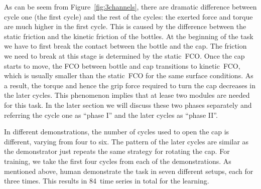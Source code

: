 As can be seem from Figure~\ref{fig:3channels}, there are dramatic
difference between cycle one (the first cycle) and the rest of the
cycles: the exerted force and torque are much higher in the first
cycle. This is caused by the difference between the static friction
and the kinetic friction of the bottles. At the beginning of the task
we have to first break the contact between the bottle and the cap. The
friction we need to break at this stage is determined by the
static~FCO. Once the cap starts to move, the FCO between bottle and
cap transitions to kinetic~FCO, which is usually smaller than the
static~FCO for the same surface conditions. As a result, the torque and
hence the grip force required to turn the cap decreases in the later
cycles. This phenomenon implies that at lease two modules are needed
for this task. In the later section we will discuss these two phases
separately and referring the cycle one as ``phase I'' and the later cycles
as ``phase II''.

In different demonstrations, the number of cycles used to open the cap is different, varying from four to six. The pattern of the later
cycles are similar as the demonstrator just repeats the same strategy for rotating the cap. For training, we take the first four cycles from each of the demonstrations. As mentioned above, human demonstrate the task in seven different setups, each for three times. This results in 84~time series in total for the learning.








